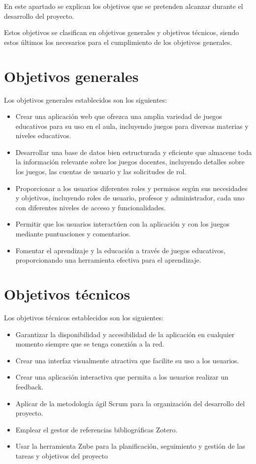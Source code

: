 
En este apartado se explican los objetivos que se pretenden alcanzar durante el desarrollo del proyecto.

Estos objetivos se clasifican en objetivos generales y objetivos técnicos, siendo estos últimos los necesarios para el cumplimiento de los objetivos generales.

\section {Objetivos generales}
Los objetivos generales establecidos son los siguientes:
\begin{itemize}
    \item Crear una aplicación web que ofrezca una amplia variedad de juegos educativos para su uso en el aula, incluyendo juegos para diversas materias y niveles educativos.
    \item Desarrollar una base de datos bien estructurada y eficiente que almacene toda la información relevante sobre los juegos docentes, incluyendo detalles sobre los juegos, las cuentas de usuario y las solicitudes de rol.
    \item Proporcionar a los usuarios diferentes roles y permisos según sus necesidades y objetivos, incluyendo roles de usuario, profesor y administrador, cada uno con diferentes niveles de acceso y funcionalidades.
    \item Permitir que los usuarios interactúen con la aplicación y con los juegos mediante puntuaciones y comentarios.
    \item Fomentar el aprendizaje y la educación a través de juegos educativos, proporcionando una herramienta efectiva para el aprendizaje.
\end{itemize}

\section {Objetivos técnicos}
Los objetivos técnicos establecidos son los siguientes:
\begin{itemize}
    \item Garantizar la disponibilidad y accesibilidad de la aplicación en cualquier momento siempre que se tenga conexión a la red.
    \item Crear una interfaz visualmente atractiva que facilite su uso a los usuarios.
    \item Crear una aplicación interactiva que permita a los usuarios realizar un feedback.
    \item Aplicar de la metodología ágil Scrum para la organización del desarrollo del proyecto.
    \item Emplear el gestor de referencias bibliográficas Zotero.
    \item Usar la herramienta Zube para la planificación, seguimiento y gestión de las tareas y objetivos del proyecto
\end{itemize}
	

